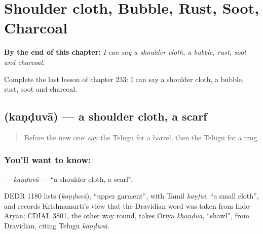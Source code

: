 
\chapter{Shoulder cloth, Bubble, Rust, Soot, Charcoal}
\label{ch:te-shoulder-cloth-bubble-rust-soot-charcoal}

\begin{chapteropening}
\textbf{By the end of this chapter:} \emph{I can say a shoulder cloth, a bubble, rust, soot and charcoal.}

Complete the last lesson of chapter 233: I can say a shoulder cloth, a bubble, rust, soot and charcoal.
\end{chapteropening}

\section[\texorpdfstring{\te{కండువా} (kaṇḍuvā)}{కండువా (kaṇḍuvā)}]{ (kaṇḍuvā) — a shoulder cloth, a scarf}

\label{lesson:TE-C233-kanduva}



\begin{quote}
Before the new one: say the Telugu for a barrel, then the Telugu for a mug.
\end{quote}

\subsection*{You'll want to know: }
\textbf{} — \emph{kaṇḍuvā} — \textquotedblleft{}a shoulder cloth, a scarf\textquotedblright{}.

\begin{cousinweb}
DEDR 1180 lists \textbf{} (\emph{kaṇḍuvā}), \textquotedblleft{}upper garment\textquotedblright{}, with Tamil \emph{kaṇṭai}, \textquotedblleft{}a small cloth\textquotedblright{}, and records Krishnamurti's view that the Dravidian word was taken from Indo-Aryan; CDIAL 3801, the other way round, takes Oriya \emph{khaṇḍuā}, \textquotedblleft{}shawl\textquotedblright{}, from Dravidian, citing Telugu \emph{kaṇḍuvā}.
\end{cousinweb}

